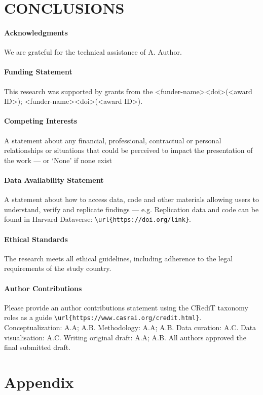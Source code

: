 \documentclass[
  journal=pasa,
  manuscript=research-paper,
  year=202X,
  volume=YY,
]{cup-journal}
\begin{document}
\section{CONCLUSIONS}
\newpage
\paragraph{Acknowledgments}
We are grateful for the technical assistance of A. Author.

\paragraph{Funding Statement}
This research was supported by grants from the <funder-name><doi>(<award ID>); <funder-name><doi>(<award ID>).

\paragraph{Competing Interests}
A statement about any financial, professional, contractual or personal relationships or situations that could be perceived to impact the presentation of the work --- or `None' if none exist
\paragraph{Data Availability Statement}
A statement about how to access data, code and other materials allowing users to understand, verify and replicate findings --- e.g. Replication data and code can be found in Harvard Dataverse: \verb+\url{https://doi.org/link}+.
\paragraph{Ethical Standards}
The research meets all ethical guidelines, including adherence to the legal requirements of the study country.
\paragraph{Author Contributions}
Please provide an author contributions statement using the CRediT taxonomy roles as a guide {\verb+\url{https://www.casrai.org/credit.html}+}. Conceptualization: A.A; A.B. Methodology: A.A; A.B. Data curation: A.C. Data visualisation: A.C. Writing original draft: A.A; A.B. All authors approved the final submitted draft.

\printendnotes


\appendix

\section{Appendix}
\end{document}
